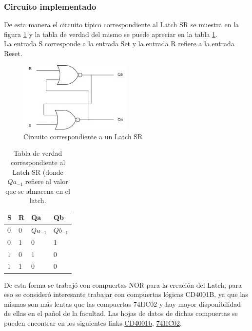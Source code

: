 \subsubsection{Circuito implementado}
\noindent
De esta manera el circuito típico correspondiente al Latch SR se muestra en la figura \ref{ej6_latch_sr} y la tabla de verdad del mismo se puede apreciar en la tabla \ref{ej6_tabla_latch_sr}. \\
%
La entrada S corresponde a la entrada Set y la entrada R refiere a la entrada Reset.
%
%
%
\begin{figure}[H]
    \centering
        \centering
        \includegraphics[width=0.5\textwidth]{figs/Ej6/latchsr.jpg} %
         \caption{Circuito correspondiente a un Latch SR}
         \label{ej6_latch_sr}
\end{figure}
%
\begin{table}[H]
\caption{Tabla de verdad correspondiente al Latch SR (donde $Qa_{-1}$ refiere al valor que se almacena en el latch.}
\label{ej6_tabla_latch_sr}
\centering
\begin{tabular}{|l|l||l|l|}
\hline
S & R & Qa & Qb \\ \hline \hline
0   & 0     & $Qa_{-1}$     & $Qb_{-1}$     \\ \hline
0   & 1     & 0     & 1   \\ \hline
1   & 0    & 1     & 0   \\ \hline
1   & 1    & 0     & 0   \\ \hline 
\end{tabular}
\end{table}
%
\noindent
De esta forma se trabajó con compuertas NOR para la creación del Latch, para eso se consideró interesante trabajar con compuertas lógicas CD4001B, ya que las mismas son más lentas que las compuertas 74HC02 y hay mayor disponibilidad de ellas en el pañol de la facultad. Las hojas de datos de dichas compuertas se pueden encontrar en los siguientes links \href{http://www.ti.com/lit/ds/symlink/cd4001b-mil.pdf}{CD4001b}, \href{http://www.ti.com/lit/ds/symlink/sn74hc02.pdf}{74HC02}.
%
